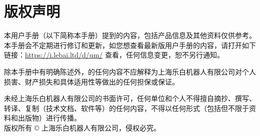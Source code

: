 \chapter*{版权声明}
\thispagestyle{empty}
{
\small

本用户手册（以下简称本手册）提到的内容，包括产品信息及其他资料仅供参考。本手册会不定期进行修订和更新，如您想查看最新版用户手册的内容，请打开如下链接：\url{https://i.lebai.ltd/d/um/} 查看{\eBook}，任何信息变更，恕不另行通知。

除本手册中有明确陈述外，{\ThisBook}的任何内容不应解释为上海乐白机器人有限公司对个人损害、财产损失和具体适用性等做出的任何担保或保证。

未经上海乐白机器人有限公司的书面许可，任何单位和个人不得擅自摘抄、撰写、转译、复制{\ThisBook}（技术文档、软件等）的任何内容，不得以任何形式（包括但不限于资料和出版物）进行传播。\\

版权所有 © 上海乐白机器人有限公司，侵权必究。
}